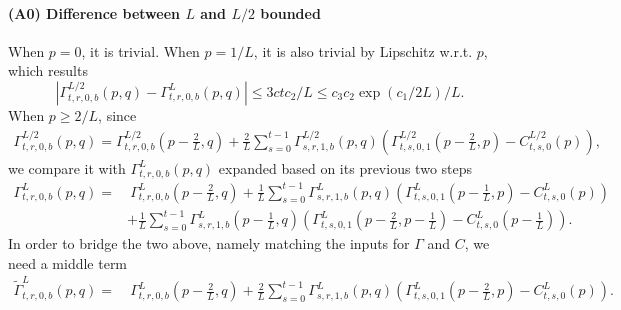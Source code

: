\paragraph{(A0) Difference between $L$ and $L/2$ bounded}

When $p=0$, it is trivial.
When $p=1/L$, it is also trivial by Lipschitz w.r.t. $p$, which results  
\[|\Gamma_{t,r,0,b}^{L/2}\left(p, q\right) - \Gamma_{t,r,0,b}^{L}\left(p, q\right)|\leq 3ctc_2/L\leq c_3 c_2\exp(c_1/2L)/L.\]
When $p\geq 2/L$, since 
\begin{align*}
    \Gamma_{t,r,0,b}^{L/2}\left(p, q\right) = \Gamma_{t,r,0,b}^{L/2}\left(p-\frac2L, q\right) + \frac2L \sum_{s=0}^{t-1} \Gamma_{s,r,1,b}^{L/2}\left(p, q\right)\left(\Gamma_{t,s,0,1}^{L/2}\left(p-\frac2L, p\right)-C_{t,s,0}^{L/2}(p)\right),
\end{align*}
we compare it with $\Gamma_{t,r,0,b}^{L}\left(p, q\right)$ expanded based on its previous two steps
\begin{align*} 
     \Gamma^L_{t,r,0,b}\left(p, q\right) = &~\Gamma^L_{t,r,0,b}\left(p-\frac2L, q\right) + \frac1L \sum_{s=0}^{t-1} \Gamma^L_{s,r,1,b}\left(p, q\right)\left(\Gamma^L_{t,s,0,1}\left(p-\frac1L, p\right)-C^L_{t,s,0}\left(p\right)\right) \\
     & + \frac1L \sum_{s=0}^{t-1} \Gamma^L_{s,r,1,b}\left(p-\frac1L, q\right)\left(\Gamma^L_{t,s,0,1}\left(p-\frac2L, p-\frac1L\right)-C^L_{t,s,0}\left(p-\frac1L\right)\right).
\end{align*}
In order to bridge the two above, namely matching the inputs for $\Gamma$ and $C$, we need a middle term 
\begin{align*} 
    \tilde\Gamma^L_{t,r,0,b}\left(p, q\right) = &~\Gamma^L_{t,r,0,b}\left(p-\frac2L, q\right) + \frac2L \sum_{s=0}^{t-1} \Gamma^L_{s,r,1,b}\left(p, q\right)\left(\Gamma^L_{t,s,0,1}\left(p-\frac2L, p\right)-C^L_{t,s,0}\left(p\right)\right).
\end{align*}

